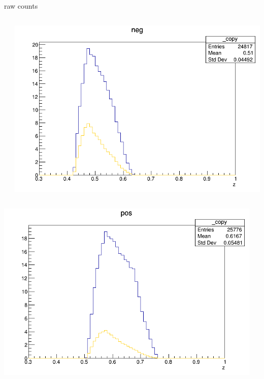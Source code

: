 \begin{frame}{raw counts}
\begin{columns}
\begin{column}[T]{0.25\textwidth}
\end{column}
\begin{column}[T]{0.25\textwidth}
\includegraphics[width = \textwidth]{results/yield/statistics/yield_x_Q2_z_0.35_4.000_0.50_neg.png}
\end{column}
\end{columns}
\begin{columns}
\begin{column}[T]{0.25\textwidth}
\includegraphics[width = \textwidth]{results/yield/statistics/yield_x_Q2_z_0.35_4.000_0.60_pos.png}
\end{column}
\begin{column}[T]{0.25\textwidth}

\end{column}
\end{columns}
\end{frame}
